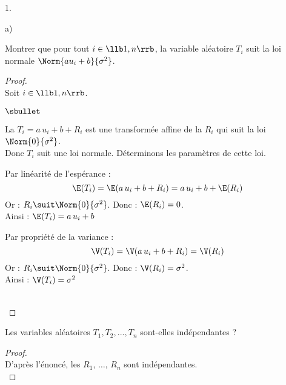 \documentclass[11pt]{article}%
\begin{document}
\begin{noliste}{1.}
 \setlength{\itemsep}{4mm}
 \setcounter{enumi}{8}
 \item 
 \begin{noliste}{a)}
  \setlength{\itemsep}{2mm}
  \item Montrer que pour tout $i \in \llb 1,n \rrb$, la variable 
  aléatoire $T_i$ suit la loi normale $\Norm{au_i+b}{\sigma^2}$.
  
  \begin{proof}~\\
  Soit $i\in \llb 1,n \rrb$.
   \begin{noliste}{$\sbullet$}
    \item La \var $T_i=a\, u_i +b+ R_i$ est une transformée affine
    de la \var $R_i$ qui suit la loi $\Norm{0}{\sigma^2}$.\\
    Donc $T_i$ suit une loi normale. Déterminons les paramètres de 
    cette loi.
    
    \item Par linéarité de l'espérance :
    \[
     \E(T_i)=\E(a \, u_i +b + R_i) = a\, u_i +b + \E(R_i)
    \]
    Or : $R_i \suit \Norm{0}{\sigma^2}$. Donc : $\E(R_i)=0$.\\
    Ainsi : $\E(T_i)=a\, u_i +b$
    
    \item Par propriété de la variance :
    \[
     \V(T_i) = \V(a\, u_i + b +R_i) = \V(R_i)
    \]
    Or : $R_i \suit \Norm{0}{\sigma^2}$. Donc : $\V(R_i)=\sigma^2$.\\
    Ainsi : $\V(T_i) = \sigma^2$
   \end{noliste}
   
   ~\\[-1.4cm]
  \end{proof}

  
  \item Les variables aléatoires $T_1,T_2,...,T_n$ sont-elles 
  indépendantes ?
  
  \begin{proof}~\\
   D'après l'énoncé, les \var $R_1$, $\ldots$, $R_n$ sont indépendantes.
   ~\\[-1cm]
  \end{proof}
 \end{noliste}
\end{noliste}
\end{document}
